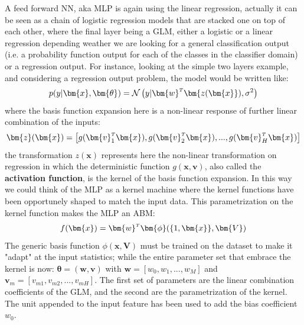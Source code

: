 A feed forward NN, aka \ac{MLP} is again using the linear regression, actually it can be seen as a chain of logistic regression models that are stacked one on top of each other, where the final layer being a \ac{GLM}, either a logistic or a linear regression depending weather we are looking for a general classification output (i.e. a probability function output for each of the classes in the classifier domain) or a regression output. 
For instance, looking at the simple two layers example, and considering a regression output problem, the model would be written like:
\begin{equation}
    p(y|\bm{x},\bm{\theta}) = \mathcal{N}\left(y|\transpose{\bm{w}}\bm{z(\bm{x}}), \sigma^2 \right)
    \label{eq:mlp_a}
\end{equation}
where the basis function expansion here is a non-linear response of further linear combination of the inputs:
\begin{equation}
    \bm{z}(\bm{x}) = \left[ g(\transpose{\bm{v}_1}\bm{x}), g(\transpose{\bm{v}_2}\bm{x}), ..., g(\transpose{\bm{v}_H}\bm{x})
    \right]
    \label{eq:mlp_b}
\end{equation}
the transformation $z(\bm{x})$ represents here the non-linear transformation on regression in which the deterministic function $g(\bm{x},\bm{v})$, also called the \textbf{activation function}, is the kernel of the basis function expansion. In this way we could think of the \acl{MLP} as a kernel machine where the kernel functions have been opportunely shaped to match the input data. This parametrization on the kernel function makes the \acl{MLP} an \ac{ABM}:
\begin{equation}
    f(\bm{x}) = \transpose{\bm{w}}\bm{\phi}(\{1,\bm{x}\}, \bm{V})
\end{equation}
The generic basis function $\phi(\bm{x},\bm{V})$ must be trained on the dataset to make it "adapt" at the input statistics; while
the entire parameter set that embrace the kernel is now: $\bm{\theta} = (\bm{w}, \bm{v})$ with $\bm{w} = [w_0, w_1, ..., w_M]$ and $\bm{v}_m = [v_{m1}, v_{m2}, ..., v_{mH}]$. The first set of parameters are the linear combination coefficients of the \ac{GLM}, and the second are the parametrization of the kernel. The unit appended to the input feature has been used to add the bias coefficient $w_0$.

